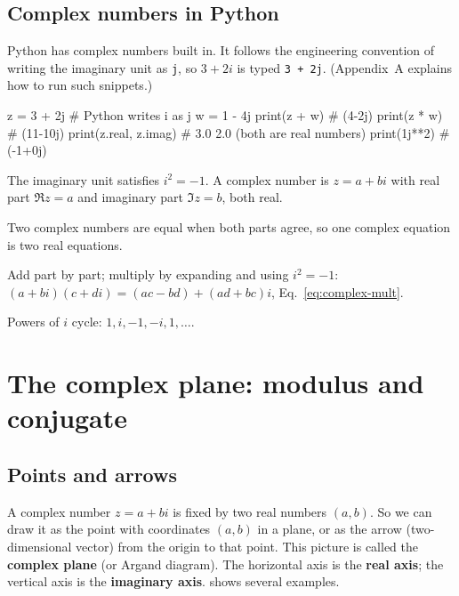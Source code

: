 \subsection{Complex numbers in Python}

Python has complex numbers built in. It follows the engineering convention of writing the imaginary unit as \texttt{j}, so $3+2i$ is typed \texttt{3 + 2j}. (Appendix~A explains how to run such snippets.)

\begin{pycode}
z = 3 + 2j            # Python writes i as j
w = 1 - 4j
print(z + w)          # (4-2j)
print(z * w)          # (11-10j)
print(z.real, z.imag) # 3.0 2.0  (both are real numbers)
print(1j**2)          # (-1+0j)
\end{pycode}

\begin{keyideas}
\item The imaginary unit satisfies $i^2=-1$. A complex number is $z=a+bi$ with real part $\Re z=a$ and imaginary part $\Im z=b$, both real.
\item Two complex numbers are equal when both parts agree, so one complex equation is two real equations.
\item Add part by part; multiply by expanding and using $i^2=-1$: $(a+bi)(c+di)=(ac-bd)+(ad+bc)i$, Eq.~\eqref{eq:complex-mult}.
\item Powers of $i$ cycle: $1,i,-1,-i,1,\dots$.
\end{keyideas}

\section{The complex plane: modulus and conjugate}\label{sec:complex-plane}

\subsection{Points and arrows}

A complex number $z=a+bi$ is fixed by two real numbers $(a,b)$. So we can draw it as the point with coordinates $(a,b)$ in a plane, or as the arrow (two-dimensional vector) from the origin to that point. This picture is called the \textbf{complex plane} (or Argand diagram). The horizontal axis is the \textbf{real axis}; the vertical axis is the \textbf{imaginary axis}.  shows several examples.

